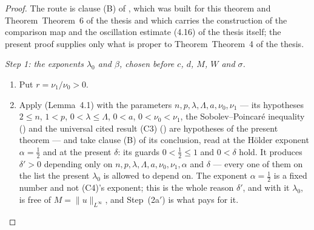 \begin{proof}
The route is clause (B) of , which was
built for this theorem and Theorem~Theorem~6 of the thesis and which carries the
construction of the comparison map and the oscillation estimate (4.16) of the thesis
itself; the present proof supplies only what is proper to Theorem~Theorem~4 of the thesis.

\emph{Step 1: the exponents $\lambda_0$ and $\beta$, chosen before $c$, $d$, $M$,
$W$ and $\sigma$.}
\begin{enumerate}
\item[(1a)] Put $r=\nu_1/\nu_0>0$.
\item[(1b)] Apply  (Lemma~4.1) with the
  parameters $n,p,\lambda,\Lambda,a,\nu_0,\nu_1$ --- its hypotheses $2\le n$,
  $1<p$, $0<\lambda\le\Lambda$, $0<a$, $0<\nu_0<\nu_1$, the
  Sobolev--Poincar\'e inequality () and the
  universal cited result (C3) () are hypotheses of
  the present theorem --- and take clause (B) of its conclusion, read at the
  H\"older exponent $\alpha=\tfrac12$ and at the present $\delta$: its guards
  $0<\tfrac12\le1$ and $0<\delta$ hold.  It produces $\delta'>0$ depending only
  on $n,p,\lambda,\Lambda,a,\nu_0,\nu_1,\alpha$ and $\delta$ --- every one of
  them on the list the present $\lambda_0$ is allowed to depend on.  The
  exponent $\alpha=\tfrac12$ is a fixed number and not (C4)'s exponent; this is
  the whole reason $\delta'$, and with it $\lambda_0$, is free of
  $M=\|u\|_{L^\infty}$, and Step~(2a$'$) is what pays for it.


\end{enumerate}
\end{proof}
